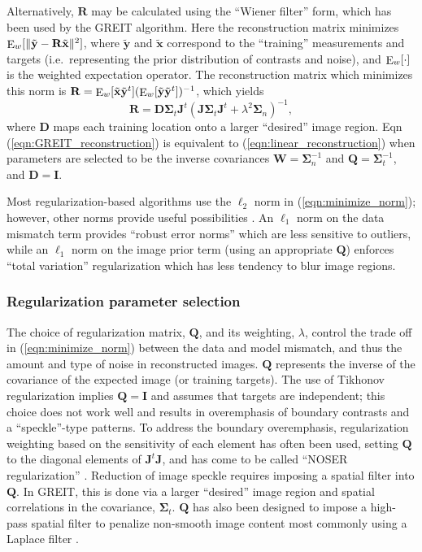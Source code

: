 \documentclass[10pt,journal]{IEEEtran}\def\TBLWIDA{15mm}\def\TBLWIDB{60mm}
\newcommand{\xT}{\tilde{\mathbf{x}}}
\newcommand{\yT}{\tilde{\mathbf{y}}}
\newcommand{\DB}{\mathbf{D}}
\newcommand{\IB}{\mathbf{I}}
\newcommand{\RB}{\mathbf{R}}
\newcommand{\QB}{\mathbf{Q}}
\newcommand{\WB}{\mathbf{W}}
\newcommand{\JB}{\mathbf{J}}
\newcommand{\SG}{\bm{\Sigma}}
\newcommand{\Ew}{\mathop{\rm E}_w}
\begin{document}
Alternatively, $\RB$ may be calculated using the ``Wiener filter'' form,
which has been used by the GREIT \cite{Adler2009GREIT} algorithm. Here the
reconstruction matrix minimizes 
$\Ew[\|\yT - \RB \xT\|^2]$, where 
$\yT$ and $\xT$ correspond to the ``training'' measurements and targets
(i.e.\ representing the prior distribution of contrasts and noise), and
$\Ew[\cdot]$ is the weighted expectation operator. The reconstruction
matrix which minimizes this norm is
$\RB = \Ew[ \xT \yT^t] (\Ew[ \yT \yT^t ])^{-1}$,
which yields \cite{Grychtol20163DEIT}
\begin{equation}
\RB= \DB \SG_t \JB^t \left( \JB \SG_t \JB^t + \lambda^2 \SG_n \right)^{-1},
\label{eqn:GREIT_reconstruction}
\end{equation}
where $\DB$ maps each training location onto
a larger ``desired'' image region.
Eqn (\ref{eqn:GREIT_reconstruction}) is equivalent to 
    (\ref{eqn:linear_reconstruction}) when parameters are
selected to be the inverse covariances
$\WB = \SG_n^{-1}$ and 
$\QB = \SG_t^{-1}$, and $\DB= \IB$.

Most regularization-based algorithms use the $\ell_2$ norm in
(\ref{eqn:minimize_norm}); however, other norms
provide useful possibilities \cite{Borsic2012PDIPM}.
An $\ell_1$ norm on the 
data mismatch term provides ``robust error norms'' which
are less sensitive to outliers, while 
an $\ell_1$ norm on the image prior term (using an appropriate $\QB$)
enforces ``total variation'' regularization which has
less tendency to blur image regions.

\subsubsection{Regularization parameter selection}

The choice of regularization matrix, $\QB$, and its weighting, $\lambda$,
control the trade off in (\ref{eqn:minimize_norm}) between the
data and model mismatch, and thus the amount and type of noise
in reconstructed images. $\QB$ represents the inverse of the
covariance of the expected image (or training targets). The use
of Tikhonov regularization implies $\QB=\IB$ and assumes that
targets are independent; this choice does not work well and
results in overemphasis of boundary contrasts and a ``speckle''-type
patterns. To address the boundary overemphasis,
 regularization weighting based on the sensitivity of each element has often
been used, setting $\QB$ to the diagonal elements of $\JB^t \JB$, and has come
to be called ``NOSER regularization'' \cite{Cheney1990NOSER}.
Reduction of image speckle requires imposing a spatial filter
into $\QB$. In GREIT, this is done via a larger ``desired'' image
region and spatial correlations in the covariance, $\SG_t$. 
$\QB$ has also been designed to impose a 
high-pass spatial filter
to penalize non-smooth image content \cite{Borsic2002Anisotropic}
most commonly using a Laplace filter \cite{Polydorides2002EIDORS}.
\end{document}
